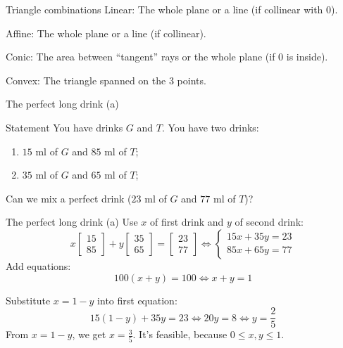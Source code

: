 \documentclass[10pt]{beamer}
\begin{document}
\begin{frame}{Triangle combinations}
    Linear: The whole plane or a line (if collinear with $0$).

    Affine: The whole plane or a line (if collinear).

    Conic: The area between ``tangent'' rays or the whole plane (if $0$ is inside).

    Convex: The triangle spanned on the $3$ points.
\end{frame}

\begin{frame}{The perfect long drink (a)}
    \begin{block}{Statement}
    You have drinks $G$ and $T$. You have two drinks:
    \begin{enumerate}
        \item $15$ ml of $G$ and $85$ ml of $T$;
        \item $35$ ml of $G$ and $65$ ml of $T$;
    \end{enumerate}

    Can we mix a perfect drink ($23$ ml of $G$ and $77$ ml of $T$)?
    \end{block}
\end{frame}

\begin{frame}{The perfect long drink (a)}
    Use $x$ of first drink and $y$ of second drink:
    $$
    x \begin{bmatrix}15 \\ 85\end{bmatrix} + y \begin{bmatrix}35 \\ 65\end{bmatrix} = \begin{bmatrix}23 \\ 77\end{bmatrix} \iff \begin{cases}
        15x + 35y = 23 \\
        85x + 65y = 77
    \end{cases}
    $$
    Add equations: $$100(x+y) = 100 \iff x + y = 1$$

    Substitute $x=1-y$ into first equation:
    $$
    15(1-y) + 35y = 23 \iff 20y = 8 \iff y = \frac{2}{5}
    $$
    From $x=1-y$, we get $x = \frac{3}{5}$. It's feasible, because $0 \leq x, y \leq 1$.
\end{frame}
\end{document}
